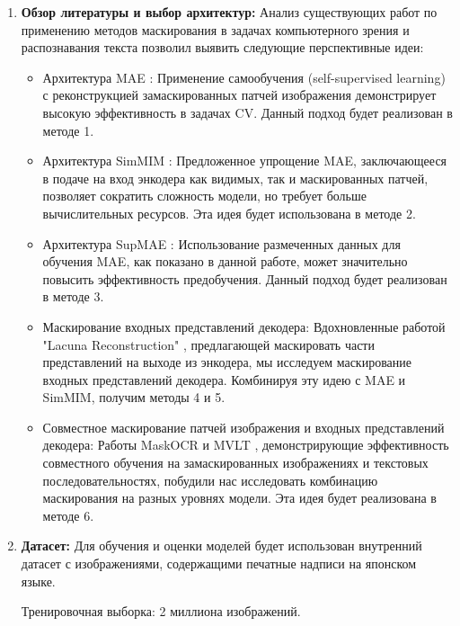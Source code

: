 \begin{enumerate}
   \item \textbf{Обзор литературы и выбор архитектур:}
   Анализ существующих работ по применению методов маскирования в задачах компьютерного зрения и распознавания текста позволил выявить следующие перспективные идеи:
   \begin{itemize}
     \item Архитектура MAE \cite{he2021masked}: Применение самообучения (self-supervised learning) с реконструкцией замаскированных патчей изображения демонстрирует высокую эффективность в задачах CV. Данный подход будет реализован в методе 1.

     \item Архитектура SimMIM \cite{xie2021simmim}: Предложенное упрощение MAE, заключающееся в подаче на вход энкодера как видимых, так и маскированных патчей, позволяет сократить сложность модели, но требует больше вычислительных ресурсов. Эта идея будет использована в методе 2.
   
     \item Архитектура SupMAE \cite{gao2022supmae}: Использование размеченных данных для обучения MAE, как показано в данной работе, может значительно повысить эффективность предобучения. Данный подход будет реализован в методе 3. 

     \item Маскирование входных представлений декодера: Вдохновленные работой "Lacuna Reconstruction" \cite{stammer2023lacuna}, предлагающей маскировать части представлений на выходе из энкодера, мы исследуем маскирование входных представлений декодера. Комбинируя эту идею с MAE и SimMIM, получим методы 4 и 5. 
     
     \item Совместное маскирование патчей изображения и входных представлений декодера: Работы MaskOCR \cite{lyons2022masked} и MVLT \cite{lyons2022masked}, демонстрирующие эффективность совместного обучения на замаскированных изображениях и текстовых последовательностях, побудили нас исследовать комбинацию маскирования на разных уровнях модели. Эта идея будет реализована в методе 6.
   \end{itemize}


   \item \textbf{Датасет:}
   Для обучения и оценки моделей будет использован внутренний датасет с изображениями, содержащими печатные надписи на японском языке. 

   Тренировочная выборка: 2 миллиона изображений.


\end{enumerate}
